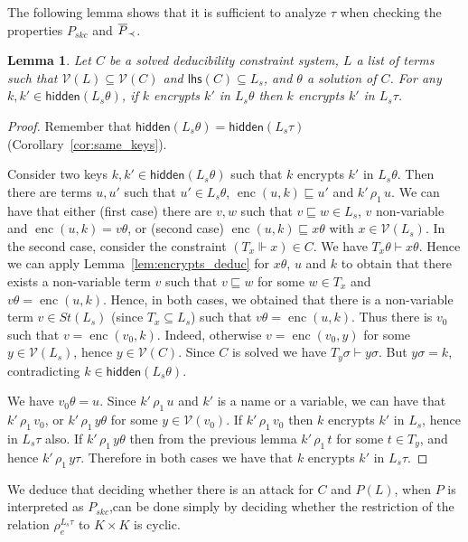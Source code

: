 \documentclass[acmtocl,acmnow]{acmtrans2m}
\newtheorem{lemma}[theorem]{Lemma}
\newcommand{\var}{\mathcal{V}}
\newcommand{\st}{\mathit{St}}
\newcommand{\lhs}{\mathsf{lhs}}
\newcommand{\penc}[2]{\operatorname{enc}(#1,#2)}
\newcommand{\enc}{\operatorname{enc}}
\newcommand{\rhoun}{\,\rho_1\,}
\newcommand{\lset}[1]{#1_s}
\newcommand{\hidden}[1]{\mathsf{hidden}({#1})}
\newcommand{\dedsys}[1]{deducibility constraint system}
\begin{document}
The
following lemma shows that it is sufficient to analyze $\tau$ when checking the properties $P_{skc}$ and
$\overline{P}_{\prec}$.
\begin{lemma}\label{lem:tau_sol_encrypts}
Let $C$ be a solved \dedsys{}, $L$ a list of terms such that $\var(L)\subseteq\var(C)$ and
$\lhs(C)\subseteq\lset{L}$, and $\theta$ a solution of $C$. For any
$k,k'\in\hidden{\lset{L}\theta}$, if $k$ encrypts $k'$ in $\lset{L}\theta$ then $k$ encrypts
$k'$ in $\lset{L}\tau$.
\end{lemma}
\begin{proof}
Remember that $\hidden{\lset{L}\theta}=\hidden{\lset{L}\tau}$ (Corollary~\ref{cor:same_keys}).

Consider two keys $k,k'\in\hidden{\lset{L}\theta}$ such that $k$ encrypts $k'$ in $\lset{L}\theta$.
Then there are terms $u, u'$ such that $u'\in \lset{L}\theta$, $\penc{u}{k}\sqsubseteq u'$ and
$k'\rhoun u$. We can have that either (first case) there are $v, w$ such that $v\sqsubseteq w\in \lset{L}$,
$v$ non-variable and $\enc(u,k)=v\theta$, or (second case) $\enc(u,k)\sqsubseteq x\theta$ with
$x\in\var(\lset{L})$. In the second case, consider the constraint $(T_x\Vdash x)\in C$. We have
$T_x\theta\vdash x\theta$. Hence we can apply Lemma~\ref{lem:encrypts_deduc} for $x\theta$, $u$
and $k$ to obtain that there exists a non-variable term $v$ such that $v \sqsubseteq w$ for some $w\in T_x$
and $v\theta = \enc(u,k)$. Hence, in both cases, we obtained that there is a non-variable term
$v\in\st(\lset{L})$ (since $T_x\subseteq \lset{L}$) such that $v\theta=\penc{u}{k}$. Thus there is $v_0$
such that $v=\penc{v_0}{k}$. Indeed, otherwise $v=\penc{v_0}{y}$ for some $y\in\var(\lset{L})$, hence $y\in\var(C)$. Since $C$ is solved we have $T_y\sigma\vdash y\sigma$. But $y\sigma=k$, contradicting $k\in\hidden{\lset{L}\theta}$.

We have $v_0\theta=u$. Since $k'\rhoun u$ and $k'$ is a name or a variable, we can have that
$k'\rhoun v_0$, or $k'\rhoun y\theta$ for some $y\in\var(v_0)$.
If $k'\rhoun v_0$ then $k$ encrypts $k'$ in $\lset{L}$, hence in $\lset{L}\tau$ also.
If $k'\rhoun y\theta$ then from the previous lemma $k'\rhoun t$ for some $t\in T_y$,
and hence $k'\rhoun y\tau$. Therefore in both
cases we have that $k$ encrypts $k'$ in $\lset{L}\tau$.
\end{proof}



We deduce that deciding whether there is an attack for  $C$ and $P(L)$,
when $P$ is interpreted as $P_{skc}$,can be done simply by
deciding whether the restriction of the relation $\rho_e^{\lset{L}\tau}$ to $K\times K$ is
cyclic.
\end{document}
